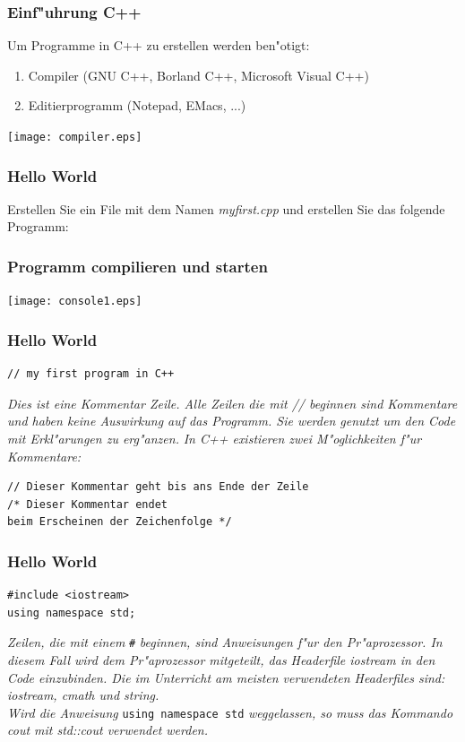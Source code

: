 \documentclass{beamer}
\begin{document}
\frame
{
	\frametitle{Einf"uhrung C++}
	Um Programme in C++ zu erstellen werden ben"otigt:
	\begin{enumerate}
	\item Compiler (GNU C++, Borland C++, Microsoft Visual C++)
	\item Editierprogramm (Notepad, EMacs, ...)
	\end{enumerate}
	\texttt{[image: compiler.eps]}
}

\frame
{
	\frametitle{Hello World}
	Erstellen Sie ein File mit dem Namen \emph{myfirst.cpp} und erstellen Sie das
	folgende Programm:
	
}

\frame
{
	\frametitle{Programm compilieren und starten}
	\texttt{[image: console1.eps]}
}

\begin{frame}[fragile]
	\frametitle{Hello World}
	\begin{lstlisting}
// my first program in C++
	\end{lstlisting}
	\emph{Dies ist eine Kommentar Zeile. Alle Zeilen die mit // beginnen sind
	Kommentare und haben keine Auswirkung auf das Programm. Sie werden
	genutzt um den Code mit Erkl"arungen zu erg"anzen.}
	\vspace{3mm}
	\emph{In C++ existieren zwei M"oglichkeiten f"ur Kommentare:}
	\begin{lstlisting}
// Dieser Kommentar geht bis ans Ende der Zeile
/* Dieser Kommentar endet
beim Erscheinen der Zeichenfolge */
	\end{lstlisting}
\end{frame}

\begin{frame}[fragile]
	\frametitle{Hello World}
	\begin{lstlisting}
#include <iostream>
using namespace std;
	\end{lstlisting}
	\emph{Zeilen, die mit einem} \verb|#| \emph{beginnen, sind Anweisungen f"ur den
	Pr"aprozessor. In diesem Fall wird dem Pr"aprozessor mitgeteilt,
	das Headerfile iostream in den Code einzubinden. Die im Unterricht
	am meisten verwendeten Headerfiles sind: iostream, cmath und string.\\
	Wird die Anweisung} \verb|using namespace std| \emph{weggelassen, so muss das Kommando cout mit std::cout verwendet werden.}
\end{frame}
\end{document}
